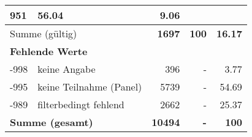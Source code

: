 \begin{longtable}{lXrrr}
       \num{951} &
       \num[round-mode=places,round-precision=2]{56,04} &
         \num[round-mode=places,round-precision=2]{9,06} \\
     \midrule
     \multicolumn{2}{l}{Summe (gültig)} &
       \textbf{\num{1697}} &
     \textbf{100} &
       \textbf{\num[round-mode=places,round-precision=2]{16,17}} \\
     \multicolumn{5}{l}{\textbf{Fehlende Werte}}\\
       -998 &
       keine Angabe &
         \num{396} &
        - &
         \num[round-mode=places,round-precision=2]{3,77} \\
       -995 &
       keine Teilnahme (Panel) &
         \num{5739} &
        - &
         \num[round-mode=places,round-precision=2]{54,69} \\
       -989 &
       filterbedingt fehlend &
         \num{2662} &
        - &
         \num[round-mode=places,round-precision=2]{25,37} \\
     \midrule
     \multicolumn{2}{l}{\textbf{Summe (gesamt)}} &
          \textbf{\num{10494}} &
        \textbf{-} &
        \textbf{100} \\
     \bottomrule
     \end{longtable}
     

